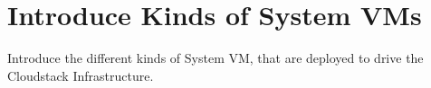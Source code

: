 \section{Introduce Kinds of System VMs}
Introduce the different kinds of System VM, that are deployed to drive the Cloudstack Infrastructure.
